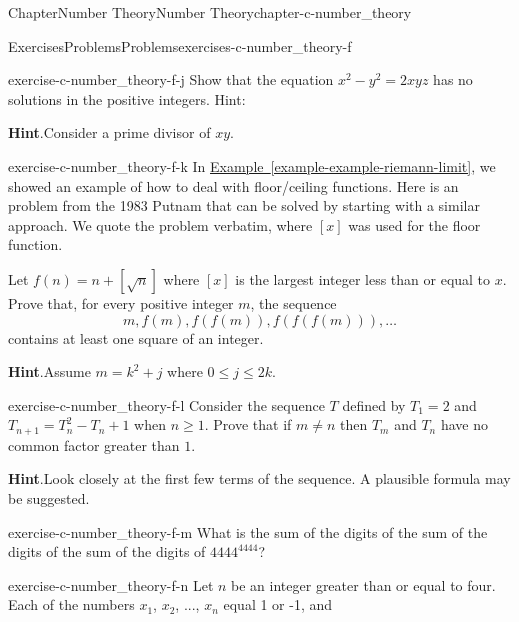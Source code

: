 \documentclass[oneside,10pt,]{book}
\newcommand{\blocktitlefont}{\relax}
\newcommand{\xreffont}{\relax}
\numberwithin{equation}{section}
\begin{document}
\begin{chapterptx}{Chapter}{Number Theory}{}{Number Theory}{}{}{chapter-c-number_theory}
\begin{exercises-section}{Exercises}{Problems}{}{Problems}{}{}{exercises-c-number_theory-f}
\begin{divisionexercise}{8}{}{}{exercise-c-number_theory-f-j}%
Show that the equation \(x^2- y^2=2x y z\) has no solutions in the positive integers. Hint:%
\par\smallskip%
\noindent\textbf{\blocktitlefont Hint}.\hypertarget{hint-c-number_theory-f-j-b}{}\quad{}Consider a prime divisor of \(x y\).%
\end{divisionexercise}%
\begin{divisionexercise}{9}{}{}{exercise-c-number_theory-f-k}%
%
In \hyperref[example-example-riemann-limit]{Example~{\xreffont\ref{example-example-riemann-limit}}}, we showed an example of how to deal with floor\slash{}ceiling functions. Here is an problem from the 1983 Putnam that can be solved by starting with a similar approach.  We quote the problem verbatim, where \([x]\) was used for the floor function.%
\par
Let \(f(n)=n +[\sqrt{n}]\) where \([x]\) is the largest integer less than or equal to \(x\).  Prove that, for every positive integer \(m\), the sequence%
\begin{equation*}
m, f(m), f(f(m)), f(f(f(m))), \dots
\end{equation*}
contains at least one square of an integer.%
\par\smallskip%
\noindent\textbf{\blocktitlefont Hint}.\hypertarget{hint-c-number_theory-f-k-c}{}\quad{}Assume \(m = k^2 + j\) where \(0 \leq j \leq 2k\).%
\end{divisionexercise}%
\begin{divisionexercise}{10}{}{}{exercise-c-number_theory-f-l}%
Consider the sequence \(T\) defined by \(T_1=2\) and \(T_{n+1}=T_n^2-T_n+1\) when \(n \geq 1\). Prove that if \(m \neq n\) then \(T_m\) and \(T_n\) have no common factor greater than \(1\).%
\par\smallskip%
\noindent\textbf{\blocktitlefont Hint}.\hypertarget{hint-c-number_theory-f-l-b}{}\quad{}Look closely at the first few terms of the sequence.  A plausible formula may be suggested.%
\end{divisionexercise}%
\begin{divisionexercise}{11}{}{}{exercise-c-number_theory-f-m}%
What is the sum of the digits of the sum of the digits of the sum of the digits of \(4444^{4444}\)?%
\end{divisionexercise}%
\begin{divisionexercise}{12}{}{}{exercise-c-number_theory-f-n}%
Let \(n\) be an integer greater than or equal to four.  Each of the numbers \(x_1\), \(x_2\), ..., \(x_n\) equal 1 or -1, and%

\end{divisionexercise}
\end{exercises-section}
\end{chapterptx}
\end{document}
